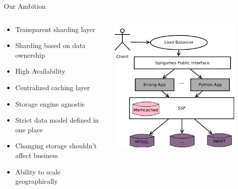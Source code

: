 \documentclass[aspectratio=169]{beamer}
\begin{document}
\begin{frame}{Our Ambition}
    \begin{columns}
        \begin{column}[c]{0.6\textwidth}
            \begin{itemize}
                \item Transparent sharding layer
                \item Sharding based on data ownership
                \item High Availability
                \item Centralized caching layer
                \item Storage engine agnostic
                \item Strict data model defined in one place
                \item Changing storage shouldn't affect business
                \item Ability to scale geographically
            \end{itemize}
        \end{column}
        \begin{column}[c]{0.4\textwidth}
            \includegraphics[width=0.9\textwidth]{images/newstorageusage.png}
        \end{column}
    \end{columns}
\end{frame}
\end{document}
